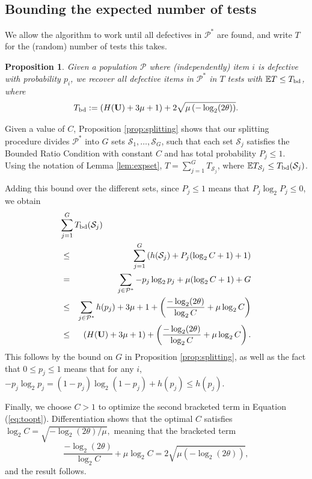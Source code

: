 \documentclass[conference]{IEEEtran}
\newtheorem{proposition}[theorem]{Proposition}
\newcommand{\vc}[1]{{\mathbf{ #1}}}
\newcommand{\ep}{{\mathbb{E}}}
\newcommand{\setS}{{\mathcal{S}}}
\newcommand{\setP}{{\mathcal{P}}}
\newcommand{\bd}{{\rm bd}}
\begin{document}
\subsection{Bounding the expected number of tests} \label{sec:expectation}
%
We allow the algorithm to work until all defectives in $\setP^*$ are found, and write $T$ for the (random) number of tests this takes.
%
\begin{proposition} \label{prop:overall} Given a population $\setP$
where (independently) item $i$ is defective with probability $p_i$,  
we  recover  all defective items in $\setP^*$ in $T$ tests with $\ep T \leq T_{\bd}$, where
\begin{equation} \label{eq:tbd}
 T_{\bd} := \left( H( \vc{U}) + 3 \mu + 1 \right) +  
 2 \sqrt{ \mu  \left( -\log_2 (2\theta) \right)}.
\end{equation}
\end{proposition}
\begin{IEEEproof} Given a value of $C$,
Proposition \ref{prop:splitting} shows that our splitting procedure divides $\setP^*$ into 
$G$ sets $\setS_1, \ldots, \setS_G$, such that each set $\setS_j$ satisfies the Bounded Ratio Condition with constant $C$ and has total probability $P_j
\leq 1$. Using the notation of Lemma \ref{lem:expset}, $T = \sum_{j=1}^G T_{\setS_j}$, where 
$\ep T_{\setS_j} \leq  T_{\bd}(\setS_j)$.

Adding this bound over the different sets, since $P_j \leq 1$ means that $P_j \log_2 P_j \leq 0$, we obtain
\begin{eqnarray} \label{eq:total}
\lefteqn{ \sum_{j=1}^G T_{\bd}(\setS_j) } \nonumber \\
& \leq &  \sum_{j=1}^G \left(  h(\setS_j)  + P_j (\log_2 C+1) + 1 \right) \nonumber \\
& = & \sum_{j \in \setP^*} -p_j \log_2 p_j + \mu  (\log_2 C+1) + G \nonumber \\
& \leq & \sum_{j \in \setP^*} h(p_j)  + 3 \mu  +  1 + \left( \frac{ -\log_2 (2\theta)}{\log_2 C} +  \mu  \log_2 C \right)  
\nonumber \\
& \leq & \left( H( \vc{U}) + 3 \mu + 1 \right) +   \left( \frac{ -\log_2 (2 \theta)}{\log_2 C} +  \mu \log_2 C \right).
\label{eq:toopt}
\end{eqnarray}
This follows by the bound on $G$ in Proposition \ref{prop:splitting}, as well as 
the fact that $ 0 \leq p_j \leq 1$ means that 
 for any $i$, $ - p_j \log_2 p_j =  (1-p_j) \log_2 (1-p_j) + h(p_j) \leq h(p_j)$.

Finally, we  choose $C > 1$ to optimize the  second bracketed term in Equation (\ref{eq:toopt}).
Differentiation shows that the optimal $C$ satisfies $\log_2 C = \sqrt{ -\log_2 (2 \theta)/\mu},$ meaning that
 the 
bracketed term $$
\frac{ -\log_2 (2 \theta)}{\log_2 C} +  \mu \log_2 C  =
 2 \sqrt{ \mu  \left( -\log_2 (2\theta) \right)} ,$$
and the result follows.
\end{IEEEproof}
\end{document}

